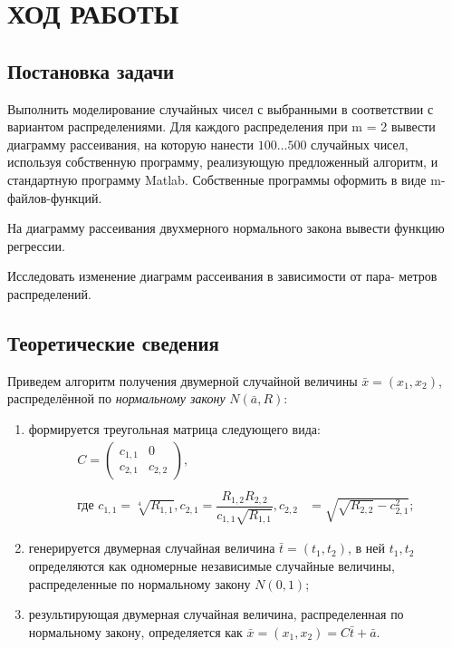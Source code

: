 \section{ХОД РАБОТЫ}

\subsection{Постановка задачи}

Выполнить моделирование случайных чисел с выбранными в соответствии с вариантом
распределениями. Для каждого распределения при m = 2 вывести диаграмму рассеивания, 
на которую нанести $ 100 \dots 500 $ случайных чисел, используя
собственную программу, реализующую предложенный алгоритм, и стандартную программу Matlab.
Собственные программы оформить в виде m-файлов-функций. 

На диаграмму рассеивания двухмерного нормального закона вывести функцию регрессии.

Исследовать изменение диаграмм рассеивания в зависимости от пара-
метров распределений.

\subsection{Теоретические сведения}
\label{sub:theory}

Приведем алгоритм получения двумерной случайной величины $ \bar x = (x_1, x_2) $,
распределённой по \textit{нормальному закону} $ N (\bar a, R) $:

\begin{enumerate}
  \item формируется треугольная матрица следующего вида:
    \begin{align*}
      C = 
      \begin{pmatrix}
        c_{1,1}&0\\
        c_{2,1}&c_{2,2}
      \end{pmatrix}, \\ \\
      \text{где } c_{1,1} = \sqrt[4]{R_{1,1}},
      c_{2,1} = \dfrac{R_{1,2} R_{2,2}}{c_{1,1} \sqrt{R_{1,1}}},
      c_{2,2} &= \sqrt{\sqrt{R_{2,2}} - c_{2,1}^2};
    \end{align*}
    
  \item генерируется двумерная случайная величина $ \bar t = (t_1, t_2) $,
    в ней $ t_1, t_2 $ определяются как одномерные независимые случайные величины, распределенные 
    по нормальному закону $ N(0, 1) $;

  \item результирующая двумерная случайная величина, распределенная по нормальному закону,
    определяется как $ \bar x = (x_1, x_2) = C \bar t + \bar a $. 
\end{enumerate}

